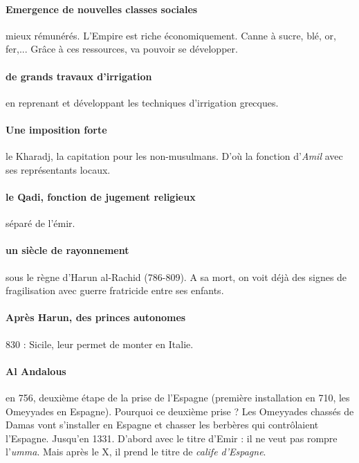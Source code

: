 \paragraph{Emergence de nouvelles classes sociales} mieux rémunérés. L'Empire est riche économiquement. Canne à sucre, blé, or, fer,... Grâce à ces ressources, va pouvoir se développer.

\paragraph{de grands travaux d'irrigation} en reprenant et développant les techniques d'irrigation grecques. 

\paragraph{Une imposition forte} le Kharadj, la capitation pour les non-musulmans. D'où la fonction d'\textit{Amil} avec ses représentants locaux.

\paragraph{le Qadi, fonction de jugement religieux} séparé de l'émir.



\paragraph{un siècle de rayonnement} sous le règne d'Harun al-Rachid (786-809). A sa mort, on voit déjà des signes de fragilisation avec guerre fratricide entre ses enfants. 


\paragraph{Après Harun, des princes autonomes}  830 : Sicile, leur permet de monter en Italie. 

\paragraph{Al Andalous} en 756, deuxième étape de la prise de l'Espagne (première installation en 710, les Omeyyades en Espagne). Pourquoi ce deuxième prise ? Les Omeyyades chassés de Damas vont s'installer en Espagne et chasser les berbères qui contrôlaient l'Espagne. Jusqu'en 1331. D'abord avec le titre d'Emir : il ne veut pas rompre l'\textit{umma}. Mais après le X, il prend le titre de \textit{calife d'Espagne}. 

